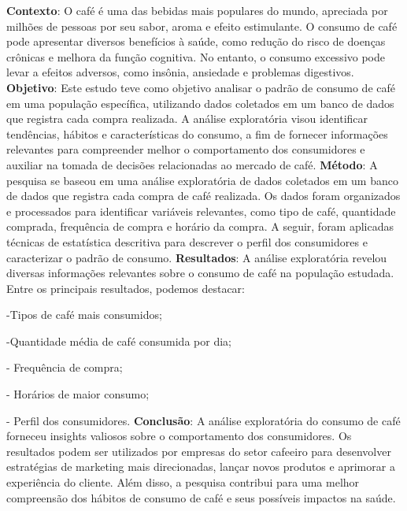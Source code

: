 
\centeredchapterstyle
\begin{resumo}
    \noindent\textbf{Contexto}: O café é uma das bebidas mais populares do mundo, apreciada por milhões de pessoas por seu sabor, aroma e efeito estimulante. O consumo de café pode apresentar diversos benefícios à saúde, como redução do risco de doenças crônicas e melhora da função cognitiva. No entanto, o consumo excessivo pode levar a efeitos adversos, como insônia, ansiedade e problemas digestivos. \textbf{Objetivo}: Este estudo teve como objetivo analisar o padrão de consumo de café em uma população específica, utilizando dados coletados em um banco de dados que registra cada compra realizada. A análise exploratória visou identificar tendências, hábitos e características do consumo, a fim de fornecer informações relevantes para compreender melhor o comportamento dos consumidores e auxiliar na tomada de decisões relacionadas ao mercado de café.  \textbf{Método}: A pesquisa se baseou em uma análise exploratória de dados coletados em um banco de dados que registra cada compra de café realizada. Os dados foram organizados e processados para identificar variáveis relevantes, como tipo de café, quantidade comprada, frequência de compra e horário da compra. A seguir, foram aplicadas técnicas de estatística descritiva para descrever o perfil dos consumidores e caracterizar o padrão de consumo. \textbf{Resultados}: A análise exploratória revelou diversas informações relevantes sobre o consumo de café na população estudada. Entre os principais resultados, podemos destacar:
    
    -Tipos de café mais consumidos;
    
    -Quantidade média de café consumida por dia;
    
    - Frequência de compra;
    
    - Horários de maior consumo;
    
    - Perfil dos consumidores. \textbf{Conclusão}: A análise exploratória do consumo de café forneceu insights valiosos sobre o comportamento dos consumidores. Os resultados podem ser utilizados por empresas do setor cafeeiro para desenvolver estratégias de marketing mais direcionadas, lançar novos produtos e aprimorar a experiência do cliente. Além disso, a pesquisa contribui para uma melhor compreensão dos hábitos de consumo de café e seus possíveis impactos na saúde.
\end{resumo}

